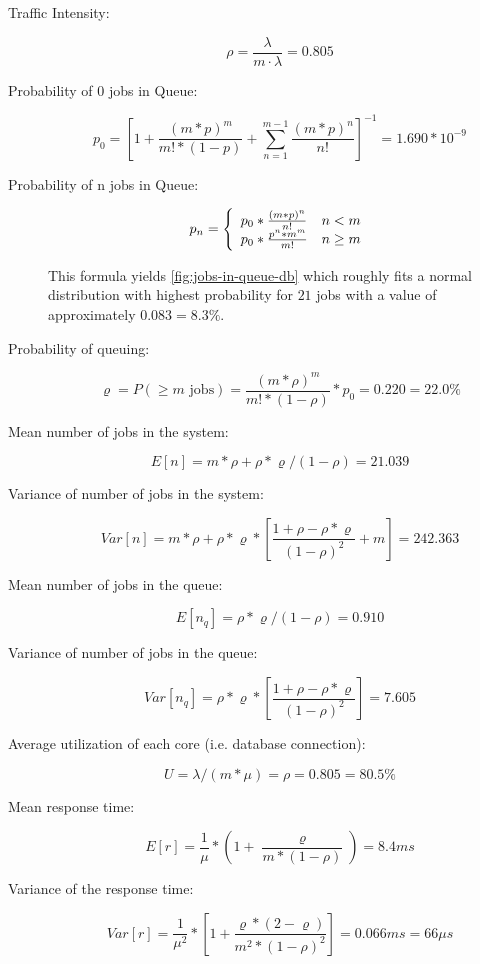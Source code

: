 \documentclass[a4paper, oneside]{csthesis}
\begin{document}
\begin{description}
\item[Traffic Intensity:]
    \[
        \rho = \frac{\lambda}{m \cdot \lambda} = 0.805
    \]

\item[Probability of 0 jobs in Queue:]
\[
p_0 = \left[1 + \frac{(m*p)^m}{m! * (1-p)} + \sum_{n=1}^{m-1}
\frac{(m*p)^n}{n!}\right]^{-1} = 1.690 * 10^{-9}
\]

\item[Probability of n jobs in Queue:]
\[
p_n = \left\{
    \begin{array}{l l}
    p_0 * \frac{(m*p)^n}{n!} & n < m\\
    p_0 * \frac{p^n*m^m}{m!} & n \geq m
    \end{array} 
    \right.
\]

This formula yields \cref{fig:jobs-in-queue-db} which roughly fits a normal
distribution with highest probability for $21$ jobs with a value of
approximately $0.083 = 8.3 \%$.

\item[Probability of queuing:]
\[
\varrho = P(\geq m \text{ jobs}) = \frac{(m*\rho)^m}{m! * (1 - \rho)}*p_0 =
0.220 = 22.0 \%
\]

\item[Mean number of jobs in the system:]
\[
E[n] = m * \rho + \rho * \varrho /(1 - \rho) = 21.039
\]

\item[Variance of number of jobs in the system:]
\[
Var[n] = m * \rho + \rho * \varrho * \left[\frac{1 + \rho - \rho *
\varrho}{(1 - \rho)^2} + m\right] = 242.363
\]

\item[Mean number of jobs in the queue:]
\[
E[n_q] = \rho * \varrho / (1-\rho) = 0.910
\]

\item[Variance of number of jobs in the queue:]
\[
Var[n_q] = \rho * \varrho * \left[\frac{1 + \rho - \rho *
\varrho}{(1-\rho)^2}\right] = 7.605
\]

\item[Average utilization of each core (i.e. database connection):]
\[
U = \lambda/(m*\mu) = \rho = 0.805 = 80.5 \%
\]

\item[Mean response time:]
\[
E[r] = \frac{1}{\mu} * (1 + \frac{\varrho}{m * (1 - \rho)}) = 8.4 ms
\]

\item[Variance of the response time:]
\[
Var[r] = \frac{1}{\mu^2} * \left[1 + \frac{\varrho * (2 -
\varrho)}{m^2*(1 - \rho)^2}\right] = 0.066 ms = 66 \mu s
\]


\end{description}
\end{document}
